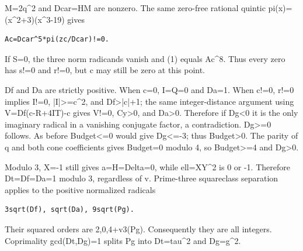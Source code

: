 M=\allowbreak{}2q\textasciicircum{}\allowbreak{}2 and Dcar=\allowbreak{}HM are nonzero. The same zero-free rational quintic pi(x)=\allowbreak{}(x\textasciicircum{}\allowbreak{}2+\allowbreak{}3)(x\textasciicircum{}\allowbreak{}3-19) gives



\begin{verbatim}
Ac=Dcar^5*pi(zc/Dcar)!=0.
\end{verbatim}

If S=\allowbreak{}0, the three norm radicands vanish and (1) equals Ac\textasciicircum{}\allowbreak{}8. Thus every zero has s!=\allowbreak{}0 and r!=\allowbreak{}0, but c may still be zero at this point.



Df and Da are strictly positive. When c=\allowbreak{}0, I=\allowbreak{}Q=\allowbreak{}0 and Da=\allowbreak{}1. When c!=\allowbreak{}0, r!=\allowbreak{}0 implies I!=\allowbreak{}0, |I|\textgreater{}\allowbreak{}=\allowbreak{}c\textasciicircum{}\allowbreak{}2, and Df\textgreater{}\allowbreak{}|c|+\allowbreak{}1; the same integer-distance argument using V=\allowbreak{}Df(c-R+\allowbreak{}4IT)-c gives V!=\allowbreak{}0, Cy\textgreater{}\allowbreak{}0, and Da\textgreater{}\allowbreak{}0. Therefore if Dg\textless{}\allowbreak{}0 it is the only imaginary radical in a vanishing conjugate factor, a contradiction. Dg\textgreater{}\allowbreak{}=\allowbreak{}0 follows. As before Budget\textless{}\allowbreak{}=\allowbreak{}0 would give Dg\textless{}\allowbreak{}=\allowbreak{}-3; thus Budget\textgreater{}\allowbreak{}0. The parity of q and both cone coefficients gives Budget=\allowbreak{}0 modulo 4, so Budget\textgreater{}\allowbreak{}=\allowbreak{}4 and Dg\textgreater{}\allowbreak{}0.



Modulo 3, X=\allowbreak{}-1 still gives a=\allowbreak{}H=\allowbreak{}Delta=\allowbreak{}0, while ell=\allowbreak{}XY\textasciicircum{}\allowbreak{}2 is 0 or -1. Therefore Dt=\allowbreak{}Df=\allowbreak{}Da=\allowbreak{}1 modulo 3, regardless of v. Prime-three squareclass separation applies to the positive normalized radicals



\begin{verbatim}
3sqrt(Df), sqrt(Da), 9sqrt(Pg).
\end{verbatim}

Their squared orders are 2,0,4+\allowbreak{}v3(Pg). Consequently they are all integers. Coprimality gcd(Dt,Dg)=\allowbreak{}1 splits Pg into Dt=\allowbreak{}tau\textasciicircum{}\allowbreak{}2 and Dg=\allowbreak{}g\textasciicircum{}\allowbreak{}2.



